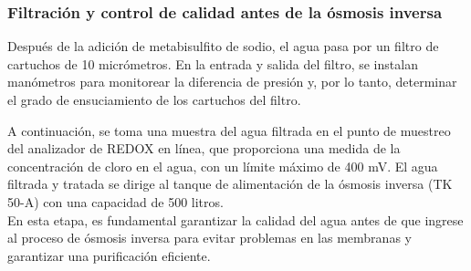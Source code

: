 \subsubsection{Filtración y control de calidad antes de la ósmosis inversa}

Después de la adición de metabisulfito de sodio, el agua pasa por un filtro de cartuchos de 10 micrómetros. En la entrada y salida del filtro,
se instalan manómetros para monitorear la diferencia de presión y, por lo tanto, determinar el grado de ensuciamiento de los cartuchos del filtro.

A continuación, se toma una muestra del agua filtrada en el punto de muestreo del analizador de REDOX en línea, que proporciona una medida de
la concentración de cloro en el agua, con un límite máximo de 400 mV. El agua filtrada y tratada se dirige al tanque de alimentación de la ósmosis
inversa (TK 50-A) con una capacidad de 500 litros. \\

En esta etapa, es fundamental garantizar la calidad del agua antes de que ingrese al proceso de ósmosis inversa para evitar problemas en las
membranas y garantizar una purificación eficiente. \\
